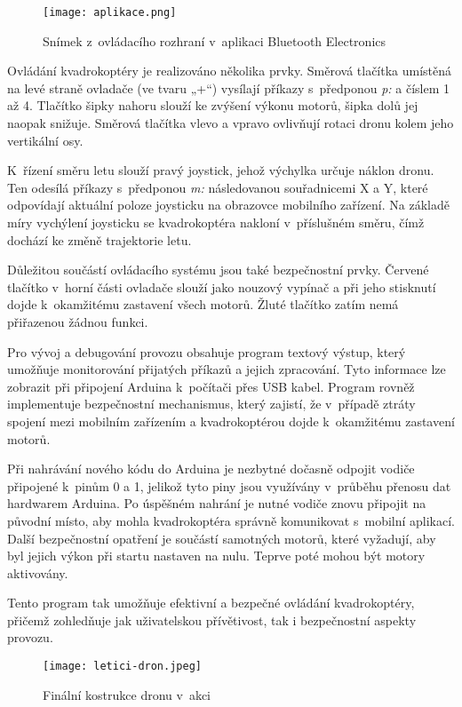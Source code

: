 \documentclass[12pt]{report}
\begin{document}
\begin{figure}[H]
	\centering
	\texttt{[image: aplikace.png]}
	\caption{Snímek z~ovládacího rozhraní v~aplikaci Bluetooth Electronics}
	\label{fig:aplikace.png}
\end{figure}

Ovládání kvadrokoptéry je realizováno několika prvky. Směrová tlačítka umístěná na levé straně ovladače (ve tvaru „+“) vysílají příkazy s~předponou \textit{p:} a číslem 1 až 4. Tlačítko šipky nahoru slouží ke zvýšení výkonu motorů, šipka dolů jej naopak snižuje. Směrová tlačítka vlevo a vpravo ovlivňují rotaci dronu kolem jeho vertikální osy.

K~řízení směru letu slouží pravý joystick, jehož výchylka určuje náklon dronu. Ten odesílá příkazy s~předponou \textit{m:} následovanou souřadnicemi X a Y, které odpovídají aktuální poloze joysticku na obrazovce mobilního zařízení. Na základě míry vychýlení joysticku se kvadrokoptéra nakloní v~příslušném směru, čímž dochází ke změně trajektorie letu.

Důležitou součástí ovládacího systému jsou také bezpečnostní prvky. Červené tlačítko v~horní části ovladače slouží jako nouzový vypínač a při jeho stisknutí dojde k~okamžitému zastavení všech motorů. Žluté tlačítko zatím nemá přiřazenou žádnou funkci.

Pro vývoj a debugování provozu obsahuje program textový výstup, který umožňuje monitorování přijatých příkazů a jejich zpracování. Tyto informace lze zobrazit při připojení Arduina k~počítači přes USB kabel. Program rovněž implementuje bezpečnostní mechanismus, který zajistí, že v~případě ztráty spojení mezi mobilním zařízením a kvadrokoptérou dojde k~okamžitému zastavení motorů.

Při nahrávání nového kódu do Arduina je nezbytné dočasně odpojit vodiče připojené k~pinům 0 a 1, jelikož tyto piny jsou využívány v~průběhu přenosu dat hardwarem Arduina. Po úspěšném nahrání je nutné vodiče znovu připojit na původní místo, aby mohla kvadrokoptéra správně komunikovat s~mobilní aplikací. Další bezpečnostní opatření je součástí samotných motorů, které vyžadují, aby byl jejich výkon při startu nastaven na nulu. Teprve poté mohou být motory aktivovány.

Tento program tak umožňuje efektivní a bezpečné ovládání kvadrokoptéry, přičemž zohledňuje jak uživatelskou přívětivost, tak i bezpečnostní aspekty provozu.

\begin{figure}[H]
	\centering
	\texttt{[image: letici-dron.jpeg]}
	\caption{Finální kostrukce dronu v~akci}
	\label{fig:letici-dron.jpeg}
\end{figure}
\end{document}
